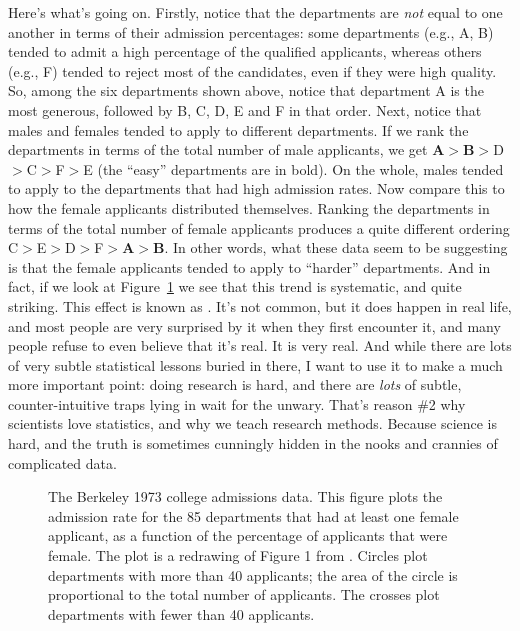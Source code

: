Here's what's going on. Firstly, notice that the departments are {\it not} equal to one another in terms of their admission percentages: some departments (e.g., A, B) tended to admit a high percentage of the qualified applicants, whereas others (e.g., F) tended to reject most of the candidates, even if they were high quality. So, among the six departments shown above, notice that department A is the most generous, followed by B, C, D, E and F in that order. Next, notice that males and females tended to apply to different departments. If we rank the departments in terms of the total number of male applicants, we get {\bf A}$>${\bf B}$>$D$>$C$>$F$>$E (the ``easy'' departments are in bold). On the whole, males tended to apply to the departments that had high admission rates. Now compare this to how the female applicants distributed themselves. Ranking the departments in terms of the total number of female applicants produces a quite different ordering C$>$E$>$D$>$F$>${\bf A}$>${\bf B}. In other words, what these data seem to be suggesting is that the female applicants tended to apply to ``harder'' departments. And in fact, if we look at Figure~\ref{fig:berkeley} we see that this trend is systematic, and quite striking. This effect is known as . It's not common, but it does happen in real life, and most people are very surprised by it when they first encounter it, and many people refuse to even believe that it's real. It is very real. And while there are lots of very subtle statistical lessons buried in there, I want to use it to make a much more important point: doing research is hard, and there are {\it lots} of subtle, counter-intuitive traps lying in wait for the unwary.  That's reason \#2 why scientists love statistics, and why we teach research methods. Because science is hard, and the truth is sometimes cunningly hidden in the nooks and crannies of complicated data.


\begin{figure}[t!]
\begin{center}
\caption[The Berkeley 1973 college admissions data.]{The Berkeley 1973 college admissions data. This figure plots the admission rate for the 85 departments that had at least one female applicant, as a function of the percentage of applicants that were female. The plot is a redrawing of Figure 1 from \textcite{Bickel1975}. Circles plot departments with more than 40 applicants; the area of the circle is proportional to the total number of applicants. The crosses plot departments with fewer than 40 applicants. } 
\label{fig:berkeley}
\HR
\end{center}
\end{figure}




